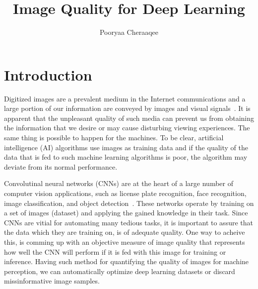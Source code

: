 \documentclass{article}
\begin{document}
\title{Image Quality for Deep Learning}
\author{Pooryaa Cheraaqee}
\maketitle


\section{Introduction} \label{sec:introductoin}
Digitized images are a prevalent medium in the Internet communications and a large portion of our information are conveyed by images and visual signals~\cite{cisco}. It is apparent that the unpleasant quality of such media can prevent us from obtaining the information that we desire or may cause disturbing viewing experiences. The same thing is possible to happen for the machines. To be clear, artificial intelligence (AI) algorithms use images as training data and if the quality of the data that is fed to such machine learning algorithms is poor, the algorithm may deviate from its normal performance.

Convolutinal neural networks (CNNs) are at the heart of a large number of computer vision applications, such as license plate recognition, face recognition, image classification, and object detection~\cite{goodfellow2016deep}. These networks operate by training on a set of images (dataset) and applying the gained knowledge in their task. Since CNNs are vitial for automating many tedious tasks, it is important to assure that the data which they are training on, is of adequate quality. One way to acheive this, is comming up with an objective measure of image quality that represents how well the CNN will perform if it is fed with this image for training or inference. Having such method for quantifying the quality of images for machine perception, we can automatically optimize deep learning datasets or discard missinformative image samples.
\end{document}
